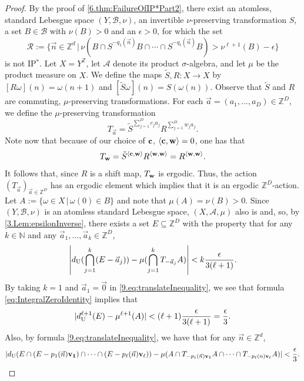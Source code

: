 \documentclass[11pt,american,preprint]{elsarticle}
\numberwithin{equation}{section}
\theoremstyle{plain}
\theoremstyle{plain*}
\theoremstyle{plain}
\theoremstyle{plain*}
\theoremstyle{plain}
\theoremstyle{plain*}
\theoremstyle{remark}
\theoremstyle{remark*}
\theoremstyle{remark}
\theoremstyle{remark*}
\theoremstyle{remark}
\theoremstyle{remark*}
\theoremstyle{plain}
\theoremstyle{definition}
\theoremstyle{plain}
\theoremstyle{plain} %
\newcommand{\N}{\mathbb{N}}
\newcommand{\Z}{\mathbb{Z}}
\begin{document}
\begin{proof}
    By the proof of \cref{6.thm:FailureOfIP*Part2}, there exist an atomless, standard Lebesgue space $(Y,\mathcal B,\nu)$, an invertible $\nu$-preserving transformation $S$, a set $B\in \mathcal B$ with $\nu(B)>0$ and an $\epsilon>0$, for which the set 
    $$
\mathcal R:=\{\vec n\in\Z^d\,|\,\nu(B\cap S^{- q_1(\vec n)}B\cap \cdots\cap S^{-q_\ell(\vec n)}B)> \nu^{\ell+1}(B)-\epsilon\}
    $$
    is not IP$^*$. Let $X=Y^\Z$, let $\mathcal A$ denote its product $\sigma$-algebra, and let $\mu$ be the product measure on $X$. We define the maps $\tilde S,R:X\rightarrow X$ by $[R\omega](n)=\omega(n+1)$ and $[\tilde S\omega](n)=S(\omega(n))$. Observe that $\tilde S$ and $R$ are commuting, $\mu$-preserving transformations. For each $\vec a=(a_1,...,a_D)\in\Z^D$, we define the $\mu$-preserving transformation 
    \begin{equation}\label{9.eq:DefnS}
    T_{\vec a}=\tilde S^{\sum_{j=1}^Dc_ja_j}R^{\sum_{j=1}^Dw_ja_j}.
    \end{equation}
     Note now that because of our choice of ${\bf c}$,  $\langle {\bf c},{\bf w}\rangle=0$, one has that 
    $$T_{ {\bf w}}= \tilde S^{\langle {\bf c},{\bf w}\rangle }R^{\langle {\bf w},{\bf w}\rangle }= R^{\langle {\bf w},{\bf w}\rangle }.$$
It follows that, since $R$ is a shift map, $T_{{\bf w}}$ is ergodic. Thus, the action  $(T_{\vec a})_{\vec a\in\Z^D}$ has an ergodic element which implies that  it is an ergodic $\Z^D$-action.\\
Let $A:=\{\omega \in X\,|\,\omega(0)\in B\}$ and note that $\mu(A)=\nu(B)>0$. Since $(Y,\mathcal B,\nu)$ is an atomless standard Lebesgue space, $(X,\mathcal A,\mu)$ also is and, so,  by \cref{3.Lem:epsilonInverse}, there exists a set $E\subseteq \Z^D$ with the property  that for any $k\in\N$ and any $\vec a_1,...,\vec a_k\in\Z^D$, 
    \begin{equation}\label{9.eq:translateInequality}
\left|d_{{\rm U}}(\bigcap_{j=1}^k(E-\vec a_j))-\mu(\bigcap_{j=1}^k T_{-\vec a_j}A)\right|<k\frac{\epsilon}{3(\ell+1)}.
    \end{equation}
By taking $k=1$ and $\vec a_1=\vec 0$ in \eqref{9.eq:translateInequality}, we see that  formula \eqref{eq:IntegralZeroIdentity} implies that 
$$|d_{{\rm U}}^{\ell+1}(E)-\mu^{\ell+1}(A)|<(\ell+1)\frac{\epsilon}{3(\ell+1)}=\frac{\epsilon}{3}.$$
Also, by formula  \eqref{9.eq:translateInequality}, we have that for any $\vec n\in \Z^d$,
$$|d_{{\rm U}}(E\cap (E-p_1(\vec n){\bf v_1})\cap\cdots\cap (E-p_\ell(\vec n){\bf v_\ell}))-\mu(A\cap T_{-p_1(\vec n){\bf v_1}}A\cap \cdots\cap T_{-p_\ell(n){\bf v_\ell}}A)|<\frac{\epsilon}{3}.$$

\end{proof}
\end{document}
